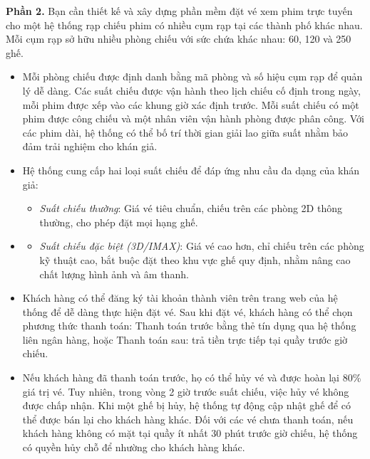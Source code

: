 \documentclass[11pt,a4paper]{article}
\begin{document}
\vspace{4pt}
\noindent\textbf{Phần 2.} Bạn cần thiết kế và xây dựng phần mềm đặt vé xem phim trực tuyến cho một hệ thống rạp chiếu phim có nhiều cụm rạp tại các thành phố khác nhau. Mỗi cụm rạp sở hữu nhiều phòng chiếu với sức chứa khác nhau: 60, 120 và 250 ghế.
\begin{itemize}[leftmargin=1.05cm,itemsep=2pt,topsep=1pt,parsep=0pt]
  \item Mỗi phòng chiếu được định danh bằng mã phòng và số hiệu cụm rạp để quản lý dễ dàng. Các suất chiếu được vận hành theo lịch chiếu cố định trong ngày, mỗi phim được xếp vào các khung giờ xác định trước. Mỗi suất chiếu có một phim được công chiếu và một nhân viên vận hành phòng được phân công. Với các phim dài, hệ thống có thể bố trí thời gian giải lao giữa suất nhằm bảo đảm trải nghiệm cho khán giả.
  \item Hệ thống cung cấp hai loại suất chiếu để đáp ứng nhu cầu đa dạng của khán giả:
  \begin{itemize}[leftmargin=0.75cm,itemsep=0pt,topsep=1pt,parsep=0pt]
    \item \textit{Suất chiếu thường}: Giá vé tiêu chuẩn, chiếu trên các phòng 2D thông thường, cho phép đặt mọi hạng ghế.
  \end{itemize}
\end{itemize}

\begingroup\small
\begin{itemize}[leftmargin=1.05cm,itemsep=2pt,topsep=0pt,parsep=0pt]
  \item[]
  \begin{itemize}[leftmargin=0.75cm,itemsep=0pt,topsep=0pt,parsep=0pt]
    \item \textit{Suất chiếu đặc biệt (3D/IMAX)}: Giá vé cao hơn, chỉ chiếu trên các phòng kỹ thuật cao, bắt buộc đặt theo khu vực ghế quy định, nhằm nâng cao chất lượng hình ảnh và âm thanh.
  \end{itemize}
  \item Khách hàng có thể đăng ký tài khoản thành viên trên trang web của hệ thống để dễ dàng thực hiện đặt vé. Sau khi đặt vé, khách hàng có thể chọn phương thức thanh toán: Thanh toán trước bằng thẻ tín dụng qua hệ thống liên ngân hàng, hoặc Thanh toán sau: trả tiền trực tiếp tại quầy trước giờ chiếu.
  \item Nếu khách hàng đã thanh toán trước, họ có thể hủy vé và được hoàn lại 80\% giá trị vé. Tuy nhiên, trong vòng 2 giờ trước suất chiếu, việc hủy vé không được chấp nhận. Khi một ghế bị hủy, hệ thống tự động cập nhật ghế để có thể được bán lại cho khách hàng khác. Đối với các vé chưa thanh toán, nếu khách hàng không có mặt tại quầy ít nhất 30 phút trước giờ chiếu, hệ thống có quyền hủy chỗ để nhường cho khách hàng khác.
\end{itemize}
\end{document}
